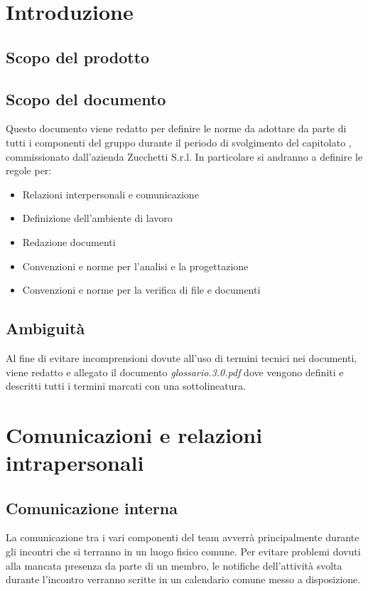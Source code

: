 

\setcounter{page}{1}
\pagestyle{normal}

\newpage
\section{Introduzione}
\subsection{Scopo del prodotto}
\purpose

\subsection{Scopo del documento}
Questo documento viene redatto per definire le norme da adottare da parte di tutti i componenti del gruppo \team{} durante il periodo di svolgimento del capitolato \caName, commissionato dall'azienda Zucchetti S.r.l. In particolare si andranno a definire le regole per:
\begin{itemize}
\item Relazioni interpersonali e comunicazione
\item Definizione dell'ambiente di lavoro
\item Redazione documenti
\item Convenzioni e norme per l'analisi e la progettazione
\item Convenzioni e norme per la verifica di file e documenti
\end{itemize}

\subsection{Ambiguità}
Al fine di evitare incomprensioni dovute all'uso di termini tecnici nei documenti, viene redatto e allegato il documento \textit{glossario.3.0.pdf} dove vengono definiti e descritti tutti i termini marcati con una sottolineatura.
\clearpage

\section{Comunicazioni e relazioni intrapersonali}
\subsection{Comunicazione interna}
\label{sec:comunicazione_interna}
La comunicazione tra i vari componenti del team avverrà principalmente durante gli incontri che si terranno in un luogo fisico comune. Per evitare problemi dovuti alla mancata presenza da parte di un membro, le notifiche dell'attività svolta durante l'incontro verranno scritte in un calendario comune messo a disposizione.

